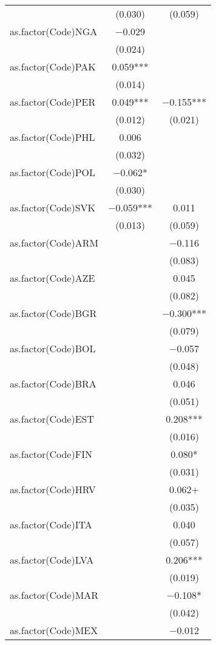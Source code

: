 \documentclass{MSword}
\begin{document}
\begin{table}
\begin{tabular}[t]{lcc}
 & (\num{0.030}) & (\num{0.059})\\
as.factor(Code)NGA & \num{-0.029} & \\
 & (\num{0.024}) & \\
as.factor(Code)PAK & \num{0.059}*** & \\
 & (\num{0.014}) & \\
as.factor(Code)PER & \num{0.049}*** & \num{-0.155}***\\
 & (\num{0.012}) & (\num{0.021})\\
as.factor(Code)PHL & \num{0.006} & \\
 & (\num{0.032}) & \\
as.factor(Code)POL & \num{-0.062}* & \\
 & (\num{0.030}) & \\
as.factor(Code)SVK & \num{-0.059}*** & \num{0.011}\\
 & (\num{0.013}) & (\num{0.059})\\
as.factor(Code)ARM &  & \num{-0.116}\\
 &  & (\num{0.083})\\
as.factor(Code)AZE &  & \num{0.045}\\
 &  & (\num{0.082})\\
as.factor(Code)BGR &  & \num{-0.300}***\\
 &  & (\num{0.079})\\
as.factor(Code)BOL &  & \num{-0.057}\\
 &  & (\num{0.048})\\
as.factor(Code)BRA &  & \num{0.046}\\
 &  & (\num{0.051})\\
as.factor(Code)EST &  & \num{0.208}***\\
 &  & (\num{0.016})\\
as.factor(Code)FIN &  & \num{0.080}*\\
 &  & \vphantom{2} (\num{0.031})\\
as.factor(Code)HRV &  & \num{0.062}+\\
 &  & \vphantom{1} (\num{0.035})\\
as.factor(Code)ITA &  & \num{0.040}\\
 &  & (\num{0.057})\\
as.factor(Code)LVA &  & \num{0.206}***\\
 &  & (\num{0.019})\\
as.factor(Code)MAR &  & \num{-0.108}*\\
 &  & (\num{0.042})\\
as.factor(Code)MEX &  & \num{-0.012}\\

\end{tabular}
\end{table}
\end{document}
